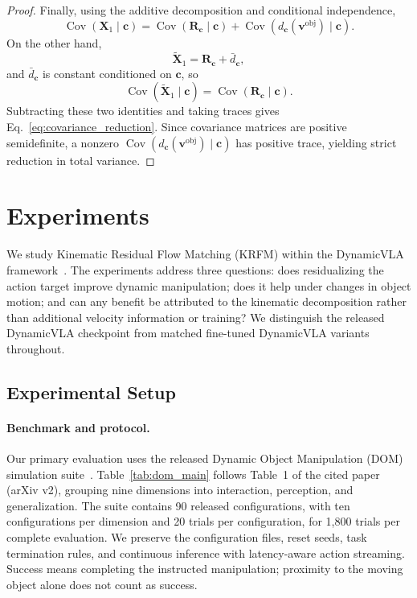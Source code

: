 \documentclass[10pt,twocolumn,letterpaper]{article}
\begin{document}
\begin{proof}
Finally, using the additive decomposition and conditional independence,
\[
    \operatorname{Cov}
    (
        \mathbf X_1
        \mid
        \mathbf c
    )
    =
    \operatorname{Cov}
    (
        \mathbf R_{\mathbf c}
        \mid
        \mathbf c
    )
    +
    \operatorname{Cov}
    (
        d_{\mathbf c}(\mathbf v^\text{obj})
        \mid
        \mathbf c
    ).
\]
On the other hand,
\[
    \widetilde{\mathbf X}_1
    =
    \mathbf R_{\mathbf c}
    +
    \bar d_{\mathbf c},
\]
and $\bar d_{\mathbf c}$ is constant conditioned on $\mathbf c$, so
\[
    \operatorname{Cov}
    (
        \widetilde{\mathbf X}_1
        \mid
        \mathbf c
    )
    =
    \operatorname{Cov}
    (
        \mathbf R_{\mathbf c}
        \mid
        \mathbf c
    ).
\]
Subtracting these two identities and taking traces gives
Eq.~\eqref{eq:covariance_reduction}. Since covariance matrices are positive
semidefinite, a nonzero
$\operatorname{Cov}(d_{\mathbf c}(\mathbf v^\text{obj})\mid\mathbf c)$ has positive
trace, yielding strict reduction in total variance.
\end{proof}


\section{Experiments}
\label{sec:experiments}

We study Kinematic Residual Flow Matching (KRFM) within the DynamicVLA
framework~\citep{xie2026dynamicvla}. The experiments address three questions:
does residualizing the action target improve dynamic manipulation; does it
help under changes in object motion; and can any benefit be attributed to the
kinematic decomposition rather than additional velocity information or training?
We distinguish the released DynamicVLA checkpoint from matched fine-tuned
DynamicVLA variants throughout.

\subsection{Experimental Setup}
\label{sec:exp_setup}

\paragraph{Benchmark and protocol.}
Our primary evaluation uses the released Dynamic Object Manipulation (DOM)
simulation suite~\citep{xie2026dynamicvla}. Table~\ref{tab:dom_main} follows
Table~1 of the cited paper (arXiv v2), grouping nine dimensions into interaction,
perception, and generalization. The suite contains 90 released configurations,
with ten configurations per dimension and 20 trials per configuration, for
1,800 trials per complete evaluation. We preserve the configuration files,
reset seeds, task termination rules, and continuous inference with
latency-aware action streaming. Success means completing the instructed
manipulation; proximity to the moving object alone does not count as success.
\end{document}
